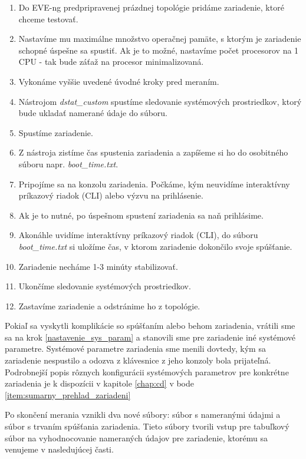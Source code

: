 \begin{enumerate}[noitemsep]
    \item Do EVE-ng predpripravenej prázdnej topológie pridáme zariadenie, ktoré chceme testovať.
    \item \label{nastavenie_sys_param} Nastavíme mu maximálne množstvo operačnej pamäte, s ktorým je zariadenie schopné úspešne sa spustiť. Ak je to možné, nastavíme počet procesorov na 1 CPU - tak bude záťaž na procesor minimalizovaná.
    \item Vykonáme vyššie uvedené úvodné kroky pred meraním.
    \item Nástrojom \emph{dstat\_custom} spustíme sledovanie systémových prostriedkov, ktorý bude ukladať namerané údaje do súboru.
    \item Spustíme zariadenie.
    \item Z nástroja zistíme čas spustenia zariadenia a zapíšeme si ho do osobitného súboru napr. \emph{boot\_time.txt}.
    \item Pripojíme sa na konzolu zariadenia. Počkáme, kým neuvidíme interaktívny príkazový riadok (CLI) alebo výzvu na prihlásenie.
    \item Ak je to nutné, po úspešnom spustení zariadenia sa naň prihlásime.
    \item Akonáhle uvidíme interaktívny príkazový riadok (CLI), do súboru \emph{boot\_time.txt} si uložíme čas, v ktorom zariadenie dokončilo svoje spúšťanie. 
    \item Zariadenie necháme 1-3 minúty stabilizovať.
    \item Ukončíme sledovanie systémových prostriedkov.
    \item Zastavíme zariadenie a odstránime ho z topológie.
\end{enumerate}

Pokiaľ sa vyskytli komplikácie so spúšťaním alebo behom zariadenia, vrátili sme sa na krok \ref{nastavenie_sys_param} a stanovili sme pre zariadenie iné systémové parametre. Systémové parametre zariadenia sme menili dovtedy, kým sa zariadenie nespustilo a odozva z klávesnice z jeho konzoly bola prijateľná. Podrobnejší popis rôznych konfigurácii systémových parametrov pre konkrétne zariadenia je k dispozícii v kapitole \ref{chap:cd} v bode \ref{item:sumarny_prehlad_zariadeni}

Po skončení merania vznikli dva nové súbory: súbor s nameranými údajmi a súbor s trvaním spúšťania zariadenia. Tieto súbory tvorili vstup pre tabuľkový súbor na vyhodnocovanie nameraných údajov pre zariadenie, ktorému sa venujeme v nasledujúcej časti.

